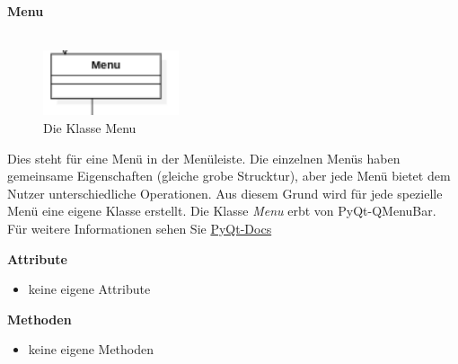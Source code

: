 \documentclass{article}
\begin{document}
\newpage
\textbf{\large{Menu}}\\\\
\begin{figure}[H]%
    \centering
    \includegraphics[width=4cm]{entwurf/Entwurf_dokument/img/Alissa/Menu.png}
    \caption{Die Klasse Menu}
\end{figure}
Dies steht für eine Menü in der Menüleiste. Die einzelnen Menüs haben gemeinsame Eigenschaften (gleiche grobe Strucktur), aber jede Menü bietet dem Nutzer unterschiedliche Operationen. Aus diesem Grund wird für jede spezielle Menü eine eigene Klasse erstellt.
Die Klasse \textit{Menu} erbt von PyQt-QMenuBar. Für weitere Informationen sehen Sie \href{https://doc.qt.io/qtforpython-5/PySide2/QtWidgets/QMenuBar.html}{PyQt-Docs}
\newline \newline

\textbf{{Attribute}}
\begin{itemize}
\item[] keine eigene Attribute \newline
\end{itemize}
    
\textbf{{Methoden}}
\begin{itemize}
\item[] keine eigene Methoden
\end{itemize}
\end{document}
